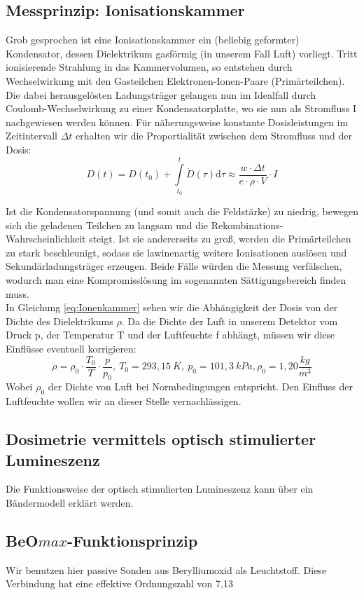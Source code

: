 \subsection{Messprinzip: Ionisationskammer}
Grob gesprochen ist eine Ionisationskammer ein (beliebig geformter) Kondensator, dessen Dielektrikum gasförmig (in unserem Fall Luft) vorliegt. Tritt ionisierende Strahlung in das Kammervolumen, so entstehen durch Wechselwirkung mit den Gasteilchen Elektronen-Ionen-Paare (Primärteilchen). Die dabei herausgelösten Ladungsträger gelangen nun im Idealfall durch Coulomb-Wechselwirkung zu einer Kondensatorplatte, wo sie nun als Stromfluss I nachgewiesen werden können. Für näherungsweise konstante Dosisleistungen im Zeitintervall $\Delta t$ erhalten wir die Proportialität zwischen dem Stromfluss und der Dosis:\\ 

\begin{equation} \label{eq:Ionenkammer}
	D(t) = D(t_0) + \int \limits_{t_0}^{t} \dot{D}(\tau) \mathrm{d}\tau \approx \frac{w \cdot \Delta t}{e \cdot \rho \cdot V} \cdot I
\end{equation}

Ist die Kondensatorspannung (und somit auch die Feldstärke) zu niedrig, bewegen sich die geladenen Teilchen zu langsam und die Rekombinations-Wahrscheinlichkeit steigt. Ist sie andererseits zu groß, werden die Primärteilchen zu stark beschleunigt, sodass sie lawinenartig weitere Ionisationen auslösen und Sekundärladungsträger erzeugen. Beide Fälle würden die Messung verfälschen, wodurch man eine Kompromisslösung im sogenannten Sättigungsbereich finden muss.\\ 

In Gleichung \ref{eq:Ionenkammer} sehen wir die Abhängigkeit der Dosis von der Dichte des Dielektrikums $\rho$. Da die Dichte der Luft in unserem Detektor vom Druck p, der Temperatur T und der Luftfeuchte f abhängt, müssen wir diese Einflüsse eventuell korrigieren:
\begin{equation}
	\rho = \rho_0 \cdot \frac{T_0}{T} \cdot \frac{p}{p_0} ,
	\ T_0 = 293,15\ K,\ p_0 = 101,3\ kPa, \rho_0 =1,20 \frac{kg}{m^3}
\end{equation}
Wobei $\rho_0$ der Dichte von Luft bei Normbedingungen entspricht. Den Einfluss der Luftfeuchte wollen wir an dieser Stelle vernachlässigen.

\subsection{Dosimetrie vermittels optisch stimulierter Lumineszenz}

Die Funktionsweise der optisch stimulierten Lumineszenz kann über ein Bändermodell erklärt werden. 


\subsection{BeO$max$-Funktionsprinzip}
Wir benutzen hier passive Sonden aus Berylliumoxid als Leuchtstoff. Diese Verbindung hat eine effektive Ordnungszahl von 7,13

